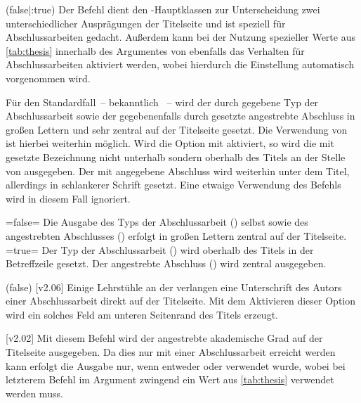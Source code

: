 \begin{DeclareEntity*}{}
\begin{DeclareEntity*}{}
\begin{DeclareEntity*}{}
\begin{Declaration}
  {}
  (false|:true)
\printdeclarationlist
%
Der Befehl  dient den \TUDScript-Hauptklassen zur Unterscheidung 
zwei unterschiedlicher Ausprägungen der Titelseite und ist speziell für 
Abschlussarbeiten gedacht. Außerdem kann bei der Nutzung spezieller Werte 
aus \autoref{tab:thesis} innerhalb des Argumentes von  ebenfalls 
das Verhalten für Abschlussarbeiten aktiviert werden, wobei hierdurch die 
Einstellung  automatisch vorgenommen wird.

Für den Standardfall~-- bekanntlich ~-- wird der 
durch  gegebene Typ der Abschlussarbeit sowie der gegebenenfalls 
durch  gesetzte angestrebte Abschluss in großen Lettern und 
sehr zentral auf der Titelseite gesetzt. Die Verwendung von  ist 
hierbei weiterhin möglich.
%
Wird die Option mit  aktiviert, so wird die mit 
 gesetzte Bezeichnung nicht unterhalb sondern oberhalb des Titels 
an der Stelle von  ausgegeben. Der mit  
angegebene Abschluss wird weiterhin unter dem Titel, allerdings in schlankerer 
Schrift gesetzt. Eine etwaige Verwendung des Befehls  wird in 
diesem Fall ignoriert.
%
\begin{DeclareValues}
\itemval=false=
  Die Ausgabe des Typs der Abschlussarbeit () selbst sowie des 
  angestrebten Abschlusses () erfolgt in großen Lettern 
  zentral auf der Titelseite.
\itemval*=true=
  Der Typ der Abschlussarbeit () wird oberhalb des Titels in der 
  Betreffzeile gesetzt. Der angestrebte Abschluss () wird 
  zentral ausgegeben.
\end{DeclareValues}
\end{Declaration}

\begin{Declaration}
  {}
  (false)
  [v2.06]
\printdeclarationlist
%
Einige Lehrstühle an der \TnUD verlangen eine Unterschrift des Autors einer 
Abschlussarbeit direkt auf der Titelseite. Mit dem Aktivieren dieser Option 
wird ein solches Feld am unteren Seitenrand des Titels erzeugt.
\end{Declaration}

\begin{Declaration}
  {}
  [v2.02]
\printdeclarationlist
%
Mit diesem Befehl wird der angestrebte akademische Grad auf der Titelseite 
ausgegeben. Da dies nur mit einer Abschlussarbeit erreicht werden kann erfolgt 
die Ausgabe nur, wenn entweder  oder  verwendet 
wurde, wobei bei letzterem Befehl im Argument zwingend ein Wert aus 
\autoref{tab:thesis} verwendet werden muss.


\end{Declaration}
\end{DeclareEntity*}
\end{DeclareEntity*}
\end{DeclareEntity*}
